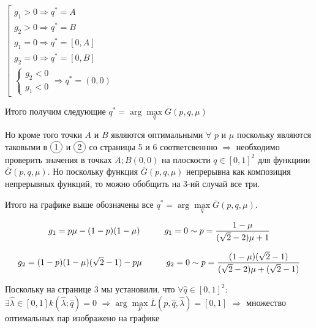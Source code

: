 \begin{flushleft}
	\begin{center}
		$\left[
		\begin{gathered}
			g_1 > 0 \Rightarrow q^*=A \\
			g_2 > 0 \Rightarrow q^*=B \\			
			g_1 = 0 \Rightarrow q^*=[0,A] \\
			g_2 = 0 \Rightarrow q^*=[0,B] \\			
			\begin{cases}			
				g_2 < 0 \\
				g_1 < 0
			\end{cases}	\Rightarrow q^*=(0,0)
		\end{gathered}
		\right.$	
	\end{center}


	Итого получим следующие $q^* = \arg \max \limits_q \overline{G}(p,q,\mu)$
	
	Но кроме того точки $A$ и $B$ являются оптимальными $\forall$ $p$ и $\mu$ поскольку
	являются таковыми в $\circled{1}$ и $\circled{2}$ со страницы 5 и 6 соответсвеннно
	$\Rightarrow$ необходимо проверить значения в точках $A;B(0,0)$ на плоскости 
	$q\in[0,1]^2$ для функциии $\overline{G}(p,q,\mu)$. Но поскольку функция
	$\overline{G}(p,q,\mu)$ непрерывна как композиция непрерывных функций, то
	можно обобщить на 3-ий случай все три.
	
	Итого на графике выше обозначены все 
	$q^* = \arg \max \limits_q \overline{G}(p,q,\mu)$.
	
	
	$$g_1=p\mu-(1-p)(1-\mu)  \hspace{10mm}
	g_1=0 \sim p=\frac{1-\mu}{(\sqrt{2}-2)\mu + 1}$$

	$$g_2=(1-p)(1-\mu)(\sqrt{2}-1)-p\mu  \hspace{10mm}
	g_2=0 \sim p=\frac{(1-\mu)(\sqrt{2}-1)}{(\sqrt{2}-2)\mu + (\sqrt{2}-1)}$$
	
	Поскольку на странице 3 мы установили, что $\forall \hat q \in [0,1]^2:$
	$\exists \hat \lambda \in [0,1] k(\hat \lambda;\hat q)=0$
	$\Rightarrow \arg \max \limits_p \overline{L}(p,\hat q, \hat \lambda)=[0,1]$
	$\Rightarrow$ множество оптимальных пар изображено на графике
	

\end{flushleft}



















